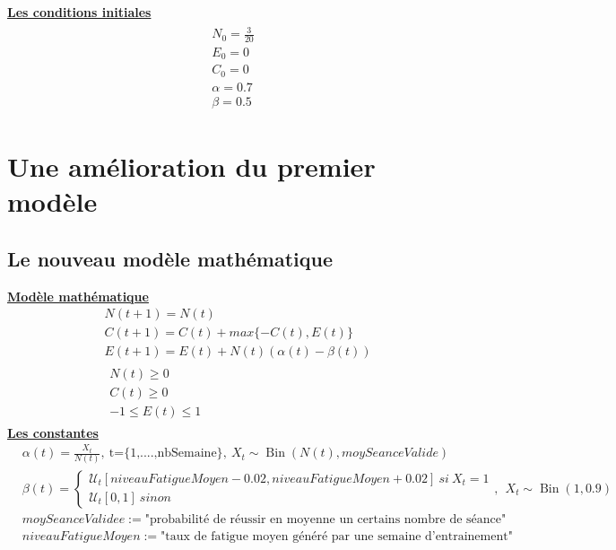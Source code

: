 \documentclass[
]{article}
\begin{document}
		\underline{\textbf{Les conditions initiales}}
		\begin{align*}
			\boxed{\begin{array}{c} N_0=\frac{3}{20} \\ E_0=0 \\
					C_0=0 \\
					\alpha=0.7 \\
					\beta=0.5
			\end{array}}
		\end{align*}
		
		\hypertarget{s2}{%
		\section{Une amélioration du premier modèle }\label{s21}}
		\hypertarget{ss1}{%
		\subsection{Le nouveau modèle mathématique }\label{ss21}}
		\underline{\textbf{Modèle mathématique}}
		\newline
		\begin{align*}
			&N(t+1)=N(t) \\
			&C(t+1)=C(t)+max\{-C(t),E(t)\} \\
			&E(t+1)=E(t)+N(t)(\alpha(t)-\beta(t)) \\
			&\boxed{\begin{array}{c} N(t) \ge 0 \\ C(t) \ge 0 \\
					-1 \le E(t) \le 1\end{array}}
		\end{align*}
		\underline{\textbf{Les constantes}}
		\newline
		\begin{align*}
			&\alpha(t) =\frac{X_t}{N(t)}, \ \text{t=\{1,....,nbSemaine\}}, \ X_t \sim \operatorname{Bin}(N(t),moySeanceValide) \\
			&\beta(t) = \begin{cases}
				\mathcal{U}_t[niveauFatigueMoyen-0.02,niveauFatigueMoyen+0.02] \ si \ X_t=1 \\
				\mathcal{U}_t[0,1] \ sinon
			\end{cases}, \ \ X_t \sim \operatorname{Bin}(1,0.9) \\
			&moySeanceValidee:=\text{"probabilité de réussir en moyenne un certains nombre de séance"} \\
			&niveauFatigueMoyen:=\text{"taux de fatigue moyen généré par une semaine d'entrainement"}
		\end{align*}
\end{document}
